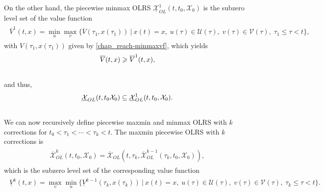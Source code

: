 \documentclass[letterpaper,10pt,english]{sphinxmanual}
\begin{document}
On the other hand, the piecewise minmax OLRS
$\underline{{\mathcal X}}_{OL}^1(t, t_0, {\mathcal X}_0)$ is the
subzero level set of the value function
\label{chap_reach:equation-minmaxvf1}\begin{gather}
\begin{split}\overline{V}^1(t, x) =
\min_u\max_v\{\overline{V}(\tau_1, x(\tau_1)) ~|~ x(t)=x, \;
u(\tau)\in{\mathcal U}(\tau), \; v(\tau)\in{\mathcal V}(\tau), \; \tau_1\leqslant\tau<t\},\end{split}\label{chap_reach-minmaxvf1}
\end{gather}
with $V(\tau_1, x(\tau_1))$ given by \eqref{chap_reach-minmaxvf}, which yields
\begin{gather}
\begin{split}\overline{V}(t, x) \geqslant\overline{V}^1(t, x),\end{split}\notag\\\begin{split}\end{split}\notag
\end{gather}
and thus,
\begin{gather}
\begin{split}\underline{{\mathcal X}}_{OL}(t, t_0 {\mathcal X}_0) \subseteq \underline{{\mathcal X}}_{OL}^1(t, t_0, {\mathcal X}_0) .\end{split}\notag\\\begin{split}\end{split}\notag
\end{gather}
We can now recursively define piecewise maxmin and minmax OLRS with
$k$ corrections for $t_0<\tau_1<\cdots<\tau_k<t$. The maxmin
piecewise OLRS with $k$ corrections is
\label{chap_reach:equation-maxmink}\begin{gather}
\begin{split}\overline{{\mathcal X}}_{OL}^k(t, t_0, {\mathcal X}_0) =
\overline{{\mathcal X}}_{OL}(t, \tau_k, \overline{{\mathcal X}}_{OL}^{k-1}(\tau_k, t_0, {\mathcal X}_0)),\end{split}\label{chap_reach-maxmink}
\end{gather}
which is the subzero level set of the corresponding value function
\label{chap_reach:equation-maxminvfk}\begin{gather}
\begin{split}\underline{V}^k(t, x) = \max_v\min_u\{\underline{V}^{k-1}(\tau_k, x(\tau_k)) ~|~ x(t)=x, \;
u(\tau)\in{\mathcal U}(\tau), \; v(\tau)\in{\mathcal V}(\tau), \; \tau_k\leqslant\tau<t\}.\end{split}\label{chap_reach-maxminvfk}
\end{gather}
\end{document}
